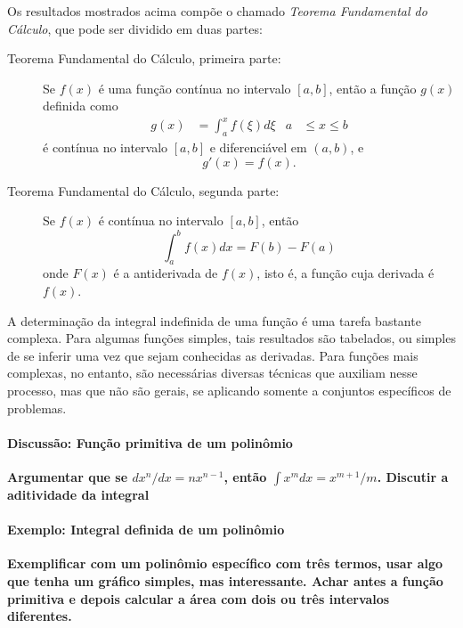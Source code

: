 Os resultados mostrados acima compõe o chamado \emph{Teorema Fundamental do Cálculo}, que pode ser dividido em duas partes:
\begin{description}
  \item[Teorema Fundamental do Cálculo, primeira parte:] Se $f(x)$ é uma função contínua no intervalo $[a,b]$, então a função $g(x)$ definida como
  \begin{align}
    g(x) &= \int_a^x f(\xi) d\xi & a&\leq x \leq b
  \end{align}
  é contínua no intervalo $[a,b]$ e diferenciável em $(a,b)$, e
  \begin{equation}
    g'(x) = f(x).
  \end{equation}
  \item[Teorema Fundamental do Cálculo, segunda parte:] Se $f(x)$ é contínua no intervalo $[a,b]$, então
  \begin{equation}
    \int_a^b f(x) dx = F(b) - F(a)
  \end{equation}
  onde $F(x)$ é a antiderivada de $f(x)$, isto é, a função cuja derivada é $f(x)$.
\end{description}

A determinação da integral indefinida de uma função é uma tarefa bastante complexa. Para algumas funções simples, tais resultados são tabelados, ou simples de se inferir uma vez que sejam conhecidas as derivadas. Para funções mais complexas, no entanto, são necessárias diversas técnicas que auxiliam nesse processo, mas que não são gerais, se aplicando somente a conjuntos específicos de problemas.

\paragraph{Discussão: Função primitiva de um polinômio}

\textbf{Argumentar que se $d x^n/ dx = n x^{n-1}$, então $\int x^m dx = x^{m + 1} / m$. Discutir a aditividade da integral}

\paragraph{Exemplo: Integral definida de um polinômio}

\textbf{Exemplificar com um polinômio específico com três termos, usar algo que tenha um gráfico simples, mas interessante. Achar antes a função primitiva e depois calcular a área com dois ou três intervalos diferentes.}

